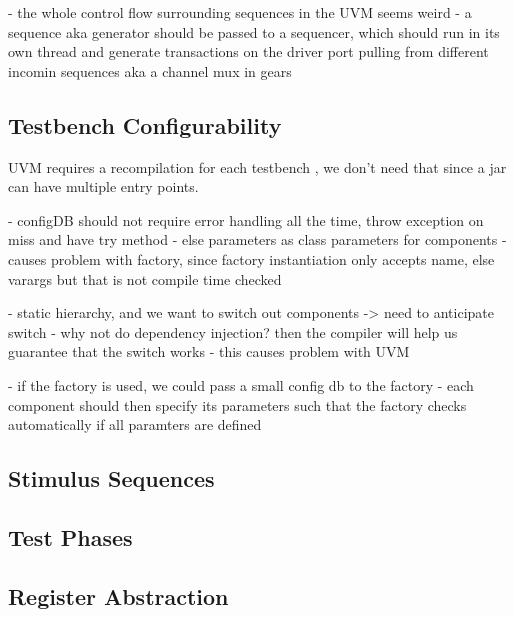 \documentclass[11pt]{report}
\begin{document}
- the whole control flow surrounding sequences in the UVM seems weird
- a sequence aka generator should be passed to a sequencer, which should run in its own thread and generate
transactions on the driver port pulling from different incomin sequences aka a channel mux in gears

\subsection{Testbench Configurability} %

UVM requires a recompilation for each testbench \cite{salemi2013uvm}, we don't need that since a jar can have
multiple entry points.

- configDB should not require error handling all the time, throw exception on miss and have try method
- else parameters as class parameters for components
- causes problem with factory, since factory instantiation only accepts name, else varargs but that is not compile time checked

- static hierarchy, and we want to switch out components -> need to anticipate switch
- why not do dependency injection? then the compiler will help us guarantee that the switch works
- this causes problem with UVM

- if the factory is used, we could pass a small config db to the factory
- each component should then specify its parameters such that the factory checks automatically if all paramters are defined

\subsection{Stimulus Sequences} %

\subsection{Test Phases} %

\subsection{Register Abstraction} %
\end{document}
